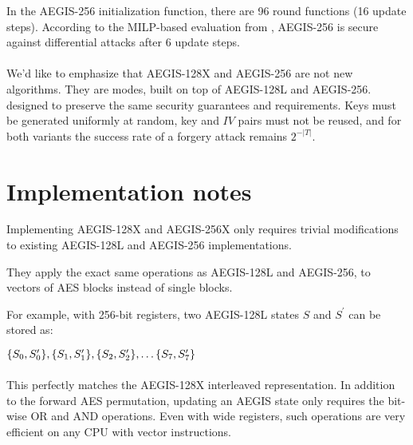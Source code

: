 \documentclass[envcountsame,runningheads,notitlepage]{llncs}
\begin{document}
In the AEGIS-256 initialization function, there are 96 round functions (16 update steps). According to the MILP-based evaluation from \cite{STSI23}, AEGIS-256 is secure against differential attacks after 6 update steps.

\paragraph{}

We'd like to emphasize that AEGIS-128X and AEGIS-256 are not new algorithms. They are modes, built on top of AEGIS-128L and AEGIS-256. designed to preserve the same security guarantees and requirements.
Keys must be generated uniformly at random, key and $IV$ pairs must not be reused, and for both variants the success rate of a forgery attack remains $2^{-\lvert T \rvert}$.

\section{Implementation notes}
\label{sec:implementation notes}

Implementing AEGIS-128X and AEGIS-256X only requires trivial modifications to existing AEGIS-128L and AEGIS-256 implementations.

They apply the exact same operations as AEGIS-128L and AEGIS-256, to vectors of AES blocks instead of single blocks.

For example, with 256-bit registers, two AEGIS-128L states $S$ and $S^{\prime}$ can be stored as:

\begin{math}
  \\
  \{ S_0, S^{\prime}_0 \}, \{ S_1, S^{\prime}_1 \}, \{ S_2, S^{\prime}_2 \}, \ldots \{ S_7, S^{\prime}_7 \}
\end{math}

\paragraph{}

This perfectly matches the AEGIS-128X interleaved representation. In addition to the forward AES permutation, updating an AEGIS state only requires the bit-wise OR and AND operations. Even with wide registers, such operations are very efficient on any CPU with vector instructions.

\paragraph{}
\end{document}
